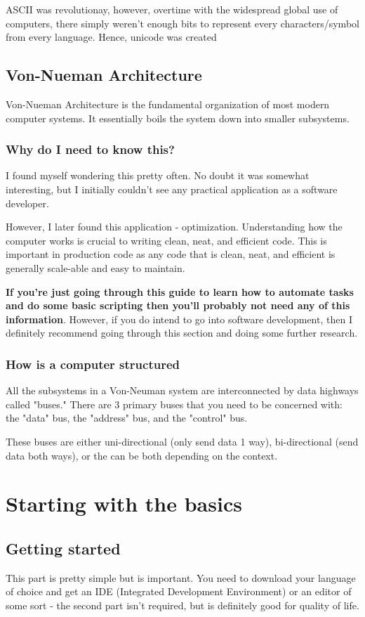 \documentclass[12pt,a4paper]{book}
\begin{document}
				ASCII was revolutionay, however, overtime with the widespread global use of computers, there simply weren't enough bits to represent every characters/symbol from every language. Hence, unicode was created 
		\section{Von-Nueman Architecture}
			Von-Nueman Architecture is the fundamental organization of most modern computer systems. It essentially boils the system down into smaller subsystems.
			
			\subsection{Why do I need to know this?}
				I found myself wondering this pretty often. No doubt it was somewhat interesting, but I initially couldn't  see any practical application as a software developer. 
				
				However, I later found this application - optimization. Understanding how the computer works is crucial to writing clean, neat, and efficient code. This is important in production code as any code that is clean, neat, and efficient is generally scale-able and easy to maintain.
				
				\textbf{If you're just going through this guide to learn how to automate tasks and do some basic scripting then you'll probably not need any of this information}. However, if you do intend to go into software development, then I definitely recommend going through this section and doing some further research.
			\subsection{How is a computer structured}
			All the subsystems in a Von-Neuman system are interconnected by data highways called "buses." There are 3 primary buses that you need to be concerned with: the "data" bus, the "address" bus, and the  "control" bus.
			
			These buses are either uni-directional (only send data 1 way), bi-directional (send data both ways), or the can be both depending on the context.
	\chapter{Starting with the basics}  \label{chap:basics}
		\section{Getting started}
			This part is pretty simple but is important. You need to download your language of choice and get an IDE (Integrated Development Environment) or an editor of some sort - the second part isn't required, but is definitely good for quality of life.
			
\end{document}

